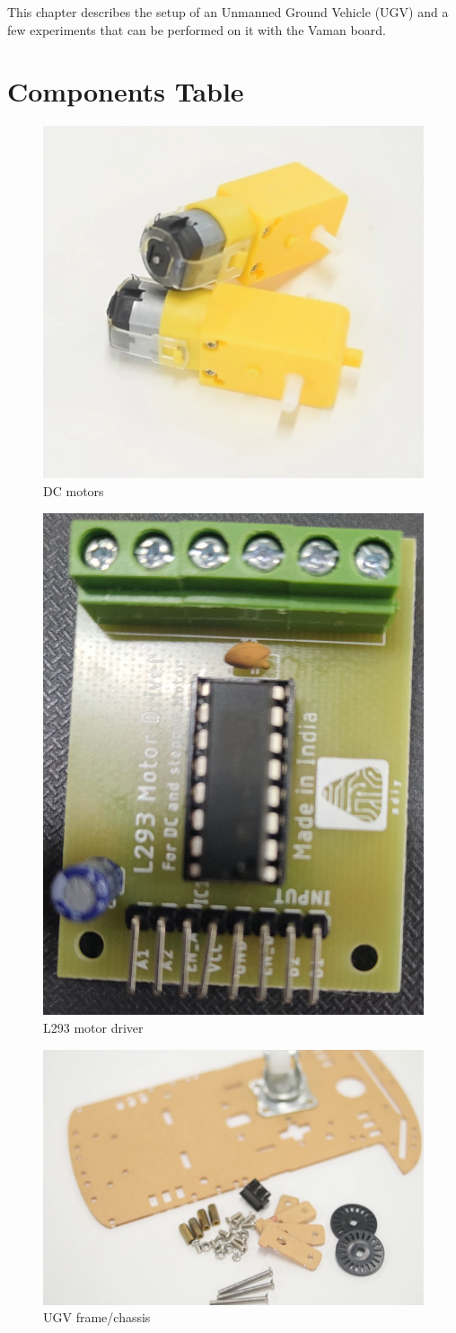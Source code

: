 This chapter describes the setup of an Unmanned Ground Vehicle (UGV) and a few 
experiments that can be performed on it with the Vaman board.
\section{Components Table}
\begin{enumerate}[label=\thesection.\arabic*.,ref=\thesection.\theenumi]
\begin{table}[!ht]
\centering
	
	\caption{components table of toycar}
	\label{Tab:components}
\end{table}
\begin{figure}[!ht]
\centering
\includegraphics[width=0.5\columnwidth]{figs/motor.png}
\caption{DC motors}
\label{fig:motor}
\end{figure}

\begin{figure}[!ht]
\centering
\includegraphics[width=0.3\columnwidth]{figs/driver.jpg}
\caption{L293 motor driver}
\label{fig:l293}
\end{figure}

\begin{figure}[!ht]
\centering
\includegraphics[width=0.5\columnwidth]{figs/base.png}
\caption{UGV frame/chassis}
\label{fig:frame}
\end{figure}


\end{enumerate}
